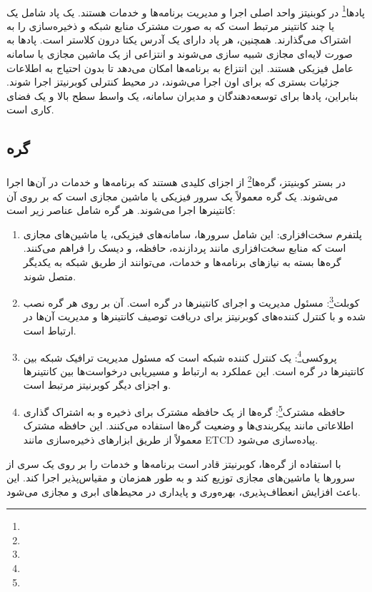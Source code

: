 \paragraph{}
{
    پاد‌ها\footnote{} در کوبنیتز واحد اصلی اجرا و مدیریت برنامه‌ها و خدمات هستند. یک پاد شامل یک یا چند کانتینر مرتبط است که به صورت مشترک منابع شبکه و ذخیره‌سازی را به اشتراک می‌گذارند. همچنین، هر پاد دارای یک آدرس یکتا درون کلاستر است. پاد‌ها به صورت لایه‌ای مجازی شبیه سازی می‌شوند و انتزاعی از یک ماشین مجازی یا سامانه عامل فیزیکی هستند. این انتزاع به برنامه‌ها امکان می‌دهد تا بدون احتیاج به اطلاعات جزئیات بستری که برای اون اجرا می‌شوند، در محیط کنترلی کوبرنیتز اجرا شوند. بنابراین، پاد‌ها برای توسعه‌دهندگان و مدیران سامانه، یک واسط سطح بالا و یک فضای کاری است.
}

\subsection{گره}
\label{subsec:node}
\paragraph{}
{
    در بستر کوبنیتز، گره‌ها\footnote{} از اجزای کلیدی هستند که برنامه‌ها و خدمات در آن‌ها اجرا می‌شوند. یک گره 
    معمولاً یک سرور فیزیکی یا ماشین مجازی است که بر روی آن کانتینرها اجرا می‌شوند. هر گره شامل عناصر زیر است:
    \begin{enumerate}
        \item پلتفرم سخت‌افزاری: این شامل سرورها، سامانه‌های فیزیکی، یا ماشین‌های مجازی است که منابع سخت‌افزاری مانند پردازنده، حافظه، و دیسک را فراهم می‌کنند. گره‌ها بسته به نیازهای برنامه‌ها و خدمات، می‌توانند از طریق شبکه به یکدیگر متصل شوند.
        \item کوبلت\footnote{}: مسئول مدیریت و اجرای کانتینرها در گره است. آن بر روی هر گره نصب شده و با کنترل کننده‌های کوبرنیتز برای دریافت توصیف کانتینرها و مدیریت آن‌ها در ارتباط است.
        \item پروکسی\footnote{}: یک کنترل کننده شبکه است که مسئول مدیریت ترافیک شبکه بین کانتینرها در گره است. این عملکرد به ارتباط و مسیریابی درخواست‌ها بین کانتینرها و اجزای دیگر کوبرنیتز مرتبط است.
        \item حافظه مشترک\footnote{}: گره‌ها از یک حافظه مشترک برای ذخیره و به اشتراک گذاری اطلاعاتی مانند پیکربندی‌ها و وضعیت گره‌ها استفاده می‌کنند. این حافظه مشترک معمولاً از طریق ابزارهای ذخیره‌سازی مانند ETCD پیاده‌سازی می‌شود.
    \end{enumerate}
    با استفاده از گره‌ها، کوبرنیتز قادر است برنامه‌ها و خدمات را بر روی یک سری از سرورها یا ماشین‌های مجازی توزیع کند و به طور همزمان و مقیاس‌پذیر اجرا کند. این باعث افزایش انعطاف‌پذیری، بهره‌وری و پایداری در محیط‌های ابری و مجازی می‌شود.
}

